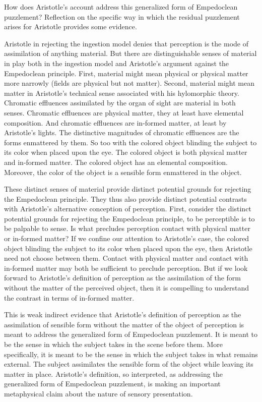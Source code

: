 How does Aristotle's account address this generalized form of Empedoclean puzzlement? Reflection on the specific way in which the residual puzzlement arises for Aristotle provides some evidence.

Aristotle in rejecting the ingestion model denies that perception is the mode of assimilation of anything material. But there are distinguishable senses of material in play both in the ingestion model and Aristotle's argument against the Empedoclean principle. First, material might mean physical or physical matter more narrowly (fields are physical but not matter). Second, material might mean matter in Aristotle's technical sense associated with his hylomorphic theory. Chromatic effluences assimilated by the organ of sight are material in both senses. Chromatic effluences are physical matter, they at least have elemental composition. And chromatic effluences are in-formed matter, at least by Aristotle's lights. The distinctive magnitudes of chromatic effluences are the forms enmattered by them. So too with the colored object blinding the subject to its color when placed upon the eye. The colored object is both physical matter and in-formed matter. The colored object has an elemental composition. Moreover, the color of the object is a sensible form enmattered in the object.

These distinct senses of material provide distinct potential grounds for rejecting the Empedoclean principle. They thus also provide distinct potential contrasts with Aristotle's alternative conception of perception. First, consider the distinct potential grounds for rejecting the Empedoclean principle, to be perceptible is to be palpable to sense. Is what precludes perception contact with physical matter or in-formed matter? If we confine our attention to Aristotle's case, the colored object blinding the subject to its color when placed upon the eye, then Aristotle need not choose between them. Contact with physical matter and contact with in-formed matter may both be sufficient to preclude perception. But if we look forward to Aristotle's definition of perception as the assimilation of the form without the matter of the perceived object, then it is compelling to understand the contrast in terms of in-formed matter. 

This is weak indirect evidence that Aristotle's definition of perception as the assimilation of sensible form without the matter of the object of perception is meant to address the generalized form of Empedoclean puzzlement. It is meant to be the sense in which the subject takes in the scene before them. More specifically, it is meant to be the sense in which the subject takes in what remains external. The subject assimilates the sensible form of the object while leaving its matter in place. Aristotle's definition, so interpreted, as addressing the generalized form of Empedoclean puzzlement, is making an important metaphysical claim about the nature of sensory presentation.




